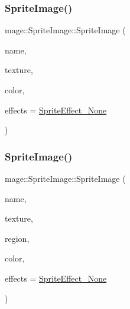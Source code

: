 \subsubsection{\texorpdfstring{Sprite\+Image()}{SpriteImage()}\hspace{0.1cm}{\footnotesize\ttfamily [1/6]}}
{\footnotesize\ttfamily mage\+::\+Sprite\+Image\+::\+Sprite\+Image (\begin{DoxyParamCaption}\item[{const string \&}]{name,  }\item[{\hyperlink{namespacemage_a1e01ae66713838a7a67d30e44c67703e}{Shared\+Ptr}$<$ \hyperlink{classmage_1_1_texture}{Texture} $>$}]{texture,  }\item[{const \hyperlink{structmage_1_1_color}{Color} \&}]{color,  }\item[{\hyperlink{namespacemage_a9cfe18123066ba4236f548f9de75d881}{Sprite\+Effect}}]{effects = {\ttfamily \hyperlink{namespacemage_a9cfe18123066ba4236f548f9de75d881af3c275fbfacfe174da928b2f24dfa515}{Sprite\+Effect\+\_\+\+None}} }\end{DoxyParamCaption})\hspace{0.3cm}{\ttfamily [explicit]}}

\hypertarget{classmage_1_1_sprite_image_a868ee995b3ef1786453e8a695908e871}{}\label{classmage_1_1_sprite_image_a868ee995b3ef1786453e8a695908e871} 
\subsubsection{\texorpdfstring{Sprite\+Image()}{SpriteImage()}\hspace{0.1cm}{\footnotesize\ttfamily [2/6]}}
{\footnotesize\ttfamily mage\+::\+Sprite\+Image\+::\+Sprite\+Image (\begin{DoxyParamCaption}\item[{const string \&}]{name,  }\item[{\hyperlink{namespacemage_a1e01ae66713838a7a67d30e44c67703e}{Shared\+Ptr}$<$ \hyperlink{classmage_1_1_texture}{Texture} $>$}]{texture,  }\item[{const R\+E\+CT \&}]{region,  }\item[{const \hyperlink{structmage_1_1_color}{Color} \&}]{color,  }\item[{\hyperlink{namespacemage_a9cfe18123066ba4236f548f9de75d881}{Sprite\+Effect}}]{effects = {\ttfamily \hyperlink{namespacemage_a9cfe18123066ba4236f548f9de75d881af3c275fbfacfe174da928b2f24dfa515}{Sprite\+Effect\+\_\+\+None}} }\end{DoxyParamCaption})\hspace{0.3cm}{\ttfamily [explicit]}}


